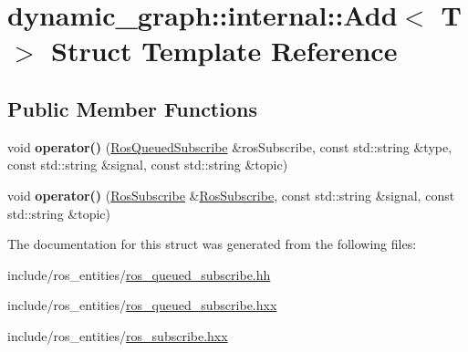 \hypertarget{structdynamic__graph_1_1internal_1_1Add}{}\section{dynamic\+\_\+graph\+:\+:internal\+:\+:Add$<$ T $>$ Struct Template Reference}
\label{structdynamic__graph_1_1internal_1_1Add}
\subsection*{Public Member Functions}
\begin{DoxyCompactItemize}
\item 
void {\bfseries operator()} (\hyperlink{classdynamic__graph_1_1RosQueuedSubscribe}{Ros\+Queued\+Subscribe} \&ros\+Subscribe, const std\+::string \&type, const std\+::string \&signal, const std\+::string \&topic)\hypertarget{structdynamic__graph_1_1internal_1_1Add_a9d0622abc8f4d539373884419740282b}{}\label{structdynamic__graph_1_1internal_1_1Add_a9d0622abc8f4d539373884419740282b}

\item 
void {\bfseries operator()} (\hyperlink{classdynamic__graph_1_1RosSubscribe}{Ros\+Subscribe} \&\hyperlink{classdynamic__graph_1_1RosSubscribe}{Ros\+Subscribe}, const std\+::string \&signal, const std\+::string \&topic)\hypertarget{structdynamic__graph_1_1internal_1_1Add_a12302c2102a5966f102a18c983926bb6}{}\label{structdynamic__graph_1_1internal_1_1Add_a12302c2102a5966f102a18c983926bb6}

\end{DoxyCompactItemize}


The documentation for this struct was generated from the following files\+:\begin{DoxyCompactItemize}
\item 
include/ros\+\_\+entities/\hyperlink{ros__queued__subscribe_8hh}{ros\+\_\+queued\+\_\+subscribe.\+hh}\item 
include/ros\+\_\+entities/\hyperlink{ros__queued__subscribe_8hxx}{ros\+\_\+queued\+\_\+subscribe.\+hxx}\item 
include/ros\+\_\+entities/\hyperlink{ros__subscribe_8hxx}{ros\+\_\+subscribe.\+hxx}\end{DoxyCompactItemize}
